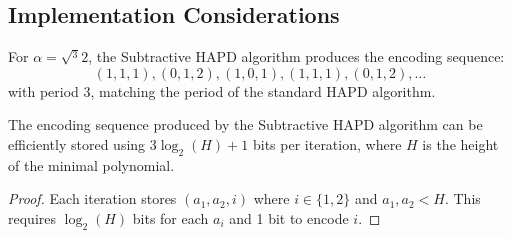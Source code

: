 \subsection{Implementation Considerations}

\begin{example}\label{ex:cube_root_implementation}
For $\alpha = \sqrt{^3}{2}$, the Subtractive HAPD algorithm produces the encoding sequence:
\begin{equation}
(1,1,1), (0,1,2), (1,0,1), (1,1,1), (0,1,2), \ldots
\end{equation}
with period 3, matching the period of the standard HAPD algorithm.
\end{example}

\begin{proposition}\label{prop:storage_efficiency}
The encoding sequence produced by the Subtractive HAPD algorithm can be efficiently stored using $3\log_2(H) + 1$ bits per iteration, where $H$ is the height of the minimal polynomial.
\end{proposition}

\begin{proof}
Each iteration stores $(a_1, a_2, i)$ where $i \in \{1,2\}$ and $a_1, a_2 < H$. This requires $\log_2(H)$ bits for each $a_i$ and 1 bit to encode $i$.
\end{proof} 
